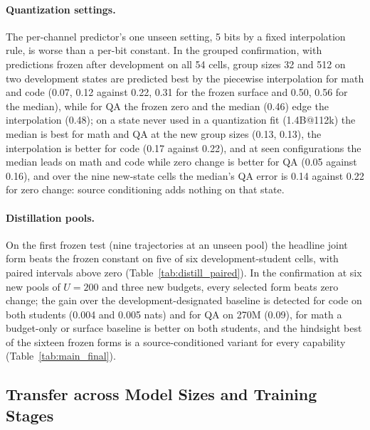 \paragraph{Quantization settings.} The per-channel predictor's one
unseen setting, 5 bits by a fixed interpolation rule, is worse than a
per-bit constant. In the grouped confirmation, with predictions frozen
after development on all 54 cells, group sizes 32 and 512 on two development states are predicted best by the piecewise interpolation for math and code (0.07, 0.12 against 0.22, 0.31 for the frozen surface and 0.50, 0.56 for the median), while for QA the frozen zero and the median (0.46) edge the interpolation (0.48); on a state never used
in a quantization fit (1.4B@112k) the median is best for math and QA
at the new group sizes (0.13, 0.13), the interpolation is better for
code (0.17 against 0.22), and at seen configurations the median leads
on math and code while zero change is better for QA (0.05 against 0.16), and over the nine new-state cells the median's QA error is 0.14 against 0.22 for zero change: source conditioning adds nothing on that state.

\paragraph{Distillation pools.} On the first frozen test (nine
trajectories at an unseen pool) the headline joint form beats the
frozen constant on five of six development-student cells, with paired
intervals above zero (Table~\ref{tab:distill_paired}). In the
confirmation at six new pools of $U{=}200$ and three new budgets,
every selected form beats zero change; the gain over the development-designated baseline is detected for code on both students (0.004 and 0.005 nats) and for QA on 270M (0.09), for math a budget-only or surface baseline is better on both students, and the hindsight best of the sixteen frozen forms is a source-conditioned variant for every capability (Table~\ref{tab:main_final}).

\subsection{Transfer across Model Sizes and Training Stages}
\label{sec:unseen_states}

